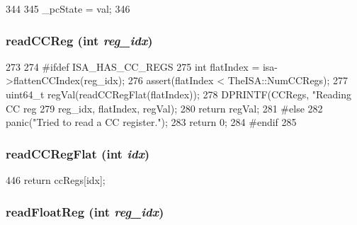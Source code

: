 \begin{DoxyCode}
344     {
345         _pcState = val;
346     }
\end{DoxyCode}
\hypertarget{classSimpleThread_ac3d147c535052bfb1f8e8fe0697168d7}{
\subsubsection[{readCCReg}]{ readCCReg (int {\em reg\_\-idx})}}
\label{classSimpleThread_ac3d147c535052bfb1f8e8fe0697168d7}



\begin{DoxyCode}
273     {
274 #ifdef ISA_HAS_CC_REGS
275         int flatIndex = isa->flattenCCIndex(reg_idx);
276         assert(flatIndex < TheISA::NumCCRegs);
277         uint64_t regVal(readCCRegFlat(flatIndex));
278         DPRINTF(CCRegs, "Reading CC reg %
279                 reg_idx, flatIndex, regVal);
280         return regVal;
281 #else
282         panic("Tried to read a CC register.");
283         return 0;
284 #endif
285     }
\end{DoxyCode}
\hypertarget{classSimpleThread_a78f8bb511732f8abab3bd11a18d32072}{
\subsubsection[{readCCRegFlat}]{ readCCRegFlat (int {\em idx})}}
\label{classSimpleThread_a78f8bb511732f8abab3bd11a18d32072}



\begin{DoxyCode}
446 { return ccRegs[idx]; }
\end{DoxyCode}
\hypertarget{classSimpleThread_a2f97d83baef4fbda00b7f7f62779752f}{
\subsubsection[{readFloatReg}]{ readFloatReg (int {\em reg\_\-idx})}}
\label{classSimpleThread_a2f97d83baef4fbda00b7f7f62779752f}



